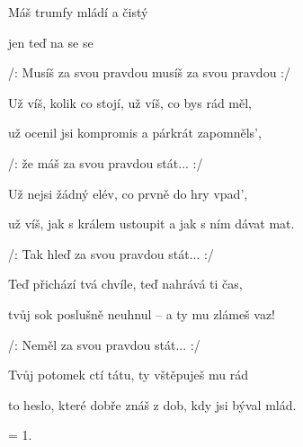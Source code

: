 

\zs
	Máš  trumfy mládí a  čistý 

  jen  teď  na  se se 

  /: Musíš za svou pravdou  musíš za svou pravdou  :/
\ks

\zs
	Už víš, kolik co stojí, už víš, co bys rád měl,

  už ocenil jsi kompromis a párkrát zapomněls',

  /: že máš za svou pravdou stát... :/
\ks

\zs
	Už nejsi žádný elév, co prvně do hry vpad',
	
	už víš, jak s králem ustoupit a jak s ním dávat mat.

  /: Tak hleď za svou pravdou stát... :/
\ks

\zs
	Teď přichází tvá chvíle, teď nahrává ti čas,
	
	tvůj sok poslušně neuhnul -- a ty mu zlámeš vaz!

  /: Neměl za svou pravdou stát... :/
\ks

\zs
	Tvůj potomek ctí tátu, ty vštěpuješ mu rád

   to heslo, které dobře znáš z dob, kdy jsi býval mlád.
\ks

\zs
	= 1.
\ks

\kp
